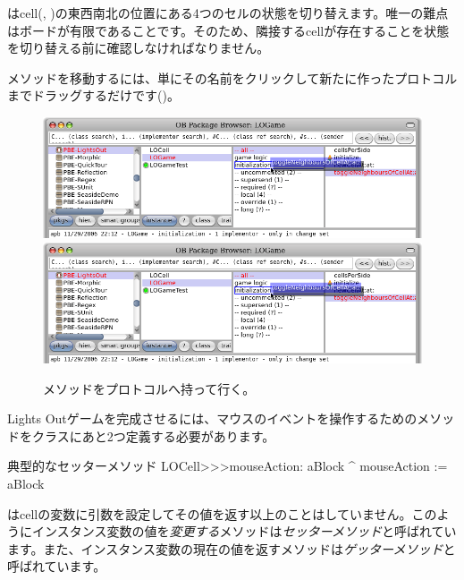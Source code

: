 \documentclass[a4paper,10pt,twoside]{book}
\begin{document}
 はcell(, )の東西南北の位置にある4つのセルの状態を切り替えます。唯一の難点はボードが有限であることです。そのため、隣接するcellが存在することを状態を切り替える前に確認しなければなりません。


メソッドを移動するには、単にその名前をクリックして新たに作ったプロトコルまでドラッグするだけです()。

\begin{figure}[htbp]
   \centering
   \ifluluelse
		{\includegraphics[width=\textwidth]{DragMethod} }
		{\includegraphics[scale=0.7]{DragMethod} }
   \caption{メソッドをプロトコルへ持って行く。}
\end{figure}

Lights Outゲームを完成させるには、マウスのイベントを操作するためのメソッドをクラスにあと2つ定義する必要があります。

\begin{method}[mouseAction:]{典型的なセッターメソッド}
LOCell>>>mouseAction: aBlock
   ^ mouseAction := aBlock
\end{method}

 はcellの変数に引数を設定してその値を返す以上のことはしていません。このようにインスタンス変数の値を\emph{変更する}メソッドは\emph{セッターメソッド}と呼ばれています。また、インスタンス変数の現在の値を返すメソッドは\emph{ゲッターメソッド}と呼ばれています。
\end{document}
